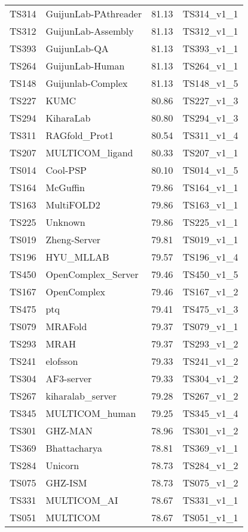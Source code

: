 \begin{longtable}{llll}
TS314 & GuijunLab-PAthreader & 81.13 & TS314\_v1\_1 \\ 
TS312 & GuijunLab-Assembly & 81.13 & TS312\_v1\_1 \\ 
TS393 & GuijunLab-QA & 81.13 & TS393\_v1\_1 \\ 
TS264 & GuijunLab-Human & 81.13 & TS264\_v1\_1 \\ 
TS148 & Guijunlab-Complex & 81.13 & TS148\_v1\_5 \\ 
TS227 & KUMC & 80.86 & TS227\_v1\_3 \\ 
TS294 & KiharaLab & 80.80 & TS294\_v1\_3 \\ 
TS311 & RAGfold\_Prot1 & 80.54 & TS311\_v1\_4 \\ 
TS207 & MULTICOM\_ligand & 80.33 & TS207\_v1\_1 \\ 
TS014 & Cool-PSP & 80.10 & TS014\_v1\_5 \\ 
TS164 & McGuffin & 79.86 & TS164\_v1\_1 \\ 
TS163 & MultiFOLD2 & 79.86 & TS163\_v1\_1 \\ 
TS225 & Unknown & 79.86 & TS225\_v1\_1 \\ 
TS019 & Zheng-Server & 79.81 & TS019\_v1\_1 \\ 
TS196 & HYU\_MLLAB & 79.57 & TS196\_v1\_4 \\ 
TS450 & OpenComplex\_Server & 79.46 & TS450\_v1\_5 \\ 
TS167 & OpenComplex & 79.46 & TS167\_v1\_2 \\ 
TS475 & ptq & 79.41 & TS475\_v1\_3 \\ 
TS079 & MRAFold & 79.37 & TS079\_v1\_1 \\ 
TS293 & MRAH & 79.37 & TS293\_v1\_2 \\ 
TS241 & elofsson & 79.33 & TS241\_v1\_2 \\ 
TS304 & AF3-server & 79.33 & TS304\_v1\_2 \\ 
TS267 & kiharalab\_server & 79.28 & TS267\_v1\_2 \\ 
TS345 & MULTICOM\_human & 79.25 & TS345\_v1\_4 \\ 
TS301 & GHZ-MAN & 78.96 & TS301\_v1\_2 \\ 
TS369 & Bhattacharya & 78.81 & TS369\_v1\_1 \\ 
TS284 & Unicorn & 78.73 & TS284\_v1\_2 \\ 
TS075 & GHZ-ISM & 78.73 & TS075\_v1\_2 \\ 
TS331 & MULTICOM\_AI & 78.67 & TS331\_v1\_1 \\ 
TS051 & MULTICOM & 78.67 & TS051\_v1\_1 \\ 

\end{longtable}
